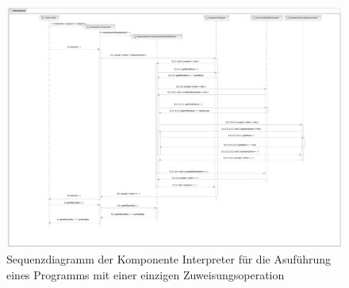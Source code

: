 \begin{landscape}%
    \begin{figure}%
        \vspace{-30mm}
        \includegraphics[width=250mm]{diagrams/interpreter_functioncall_sequence.pdf}

        \caption{Sequenzdiagramm der Komponente Interpreter für die Asuführung eines Programms mit einer einzigen Zuweisungsoperation}

    \end{figure}%
\end{landscape}%
